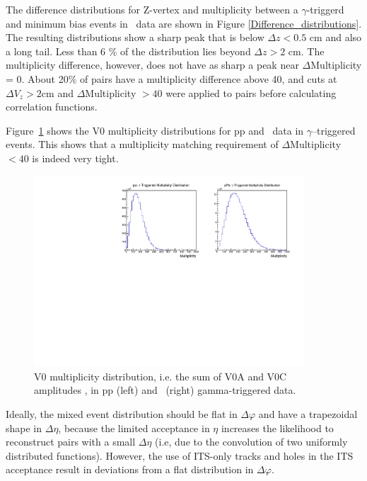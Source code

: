 The difference distributions for Z-vertex and multiplicity between a \(\gamma\)-triggerd and minimum bias events in \pPb~data are shown in Figure \ref{Difference_distributions}. The resulting distributions show a sharp peak that is below {$\Delta z<0.5$ cm} and also a long tail. Less than 6 \% of the distribution lies beyond $\Delta z > 2$ cm. The multiplicity difference, however, does not have as sharp a peak near \(\Delta\)Multiplicity = 0. About 20$\%$ of pairs have a multiplicity difference above 40, and cuts at \(\Delta V_z > 2\)cm and \(\Delta\)Multiplicity \(> 40\) were applied to pairs before calculating correlation functions.

Figure~\ref{fig:Multiplicitydistributions} shows the V0 multiplicity distributions for pp and \pPb~data in $\gamma$--triggered events. This shows that a multiplicity matching requirement of \(\Delta\)Multiplicity \(< 40\) is indeed very tight. 

\begin{figure}[h]
\center
\includegraphics[width=0.9\textwidth]{EventMixing/Abs_Multplicity_Dist.pdf}
\caption{V0 multiplicity distribution, i.e. the sum of V0A and V0C amplitudes , in pp (left) and \pPb~(right) gamma-triggered data.}
\label{fig:Multiplicitydistributions}
\end{figure}

Ideally, the mixed event distribution should be flat in \(\Delta\varphi\) and have a trapezoidal shape in \(\Delta\eta\), because the limited acceptance in \(\eta\) increases the likelihood to reconstruct pairs with a small \(\Delta\eta\) (i.e, due to the convolution of two uniformly distributed functions). However, the use of ITS-only tracks and holes in the ITS acceptance result in deviations from a flat distribution in \(\Delta\varphi\). %

